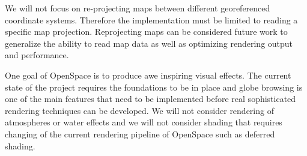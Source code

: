 We will not focus on re-projecting maps between different georeferenced coordinate systems. Therefore the implementation must be limited to reading a specific map projection. Reprojecting maps can be considered future work to generalize the ability to read map data as well as optimizing rendering output and performance.

One goal of OpenSpace is to produce awe inspiring visual effects. The current state of the project requires the foundations to be in place and globe browsing is one of the main features that need to be implemented before real sophisticated rendering techniques can be developed. We will not consider rendering of atmospheres or water effects and we will not consider shading that requires changing of the current rendering pipeline of OpenSpace such as deferred shading.
